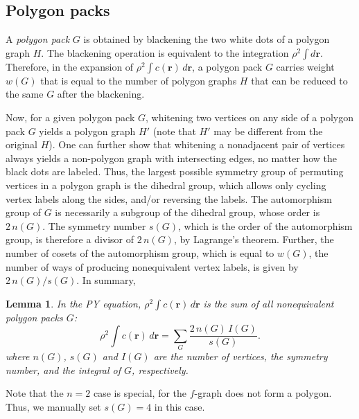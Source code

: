 \documentclass[preprint]{revtex4-1}
\newtheorem{lemm}[thrm]{Lemma}
\newcommand{\vct}[1]{\mathbf{#1}}
\providecommand{\vr}{} %
\renewcommand{\vr}{\vct{r}}
\begin{document}
\subsection{Polygon packs}



A \emph{polygon pack} $G$ is obtained
  by blackening the two white dots of a polygon graph $H$.
%
The blackening operation is equivalent to the integration $\rho^2 \int d\vr$.
%
Therefore, in the expansion of $\rho^2 \int c(\vr) \, d\vr$,
  a polygon pack $G$ carries weight $w(G)$
  that is equal to the number of polygon graphs $H$ that
  can be reduced to the same $G$ after the blackening.

Now, for a given polygon pack $G$,
  whitening two vertices on any side of
  a polygon pack $G$
  yields a polygon graph $H'$
  (note that $H'$ may be different from the original $H$).
%
One can further show that
  whitening a nonadjacent pair of vertices always yields
  a non-polygon graph with intersecting edges,
  no matter how the black dots are labeled.
%
Thus,
  the largest possible symmetry group of
  permuting vertices in a polygon graph
  is the dihedral group,
  which allows only cycling vertex labels along the sides,
  and/or reversing the labels.
%
The automorphism group of $G$
  is necessarily a subgroup of the dihedral group,
  whose order is $2 \, n(G)$.
%
The symmetry number $s(G)$,
  which is the order of the automorphism group,
  is therefore a divisor of $2 \, n(G)$,
  by Lagrange's theorem.
%
Further,
  the number of cosets of the automorphism group,
  which is equal to $w(G)$, the number of ways of
  producing nonequivalent vertex labels,
  is given by $2 \, n(G) / s(G)$.
%
In summary,
\begin{lemm}
In the PY equation,
  $\rho^2 \int c(\vr) \, d\vr$ is the sum of
  all nonequivalent polygon packs $G$:
  \begin{equation}
      \rho^2 \int c(\vr) \, d\vr
    = \sum_{G} \frac{ 2 \, n(G) \, I(G) }{ s(G) }.
  \label{eq:pykappasum}
  \end{equation}
  where $n(G)$, $s(G)$ and $I(G)$ are
  the number of vertices,
  the symmetry number,
  and the integral of $G$,
  respectively.
  \label{thm:pykappasum}
\end{lemm}
%
Note that the $n = 2$ case is special,
  for the $f$-graph does not form a polygon.
Thus, we manually set $s(G) = 4$ in this case.
\end{document}

